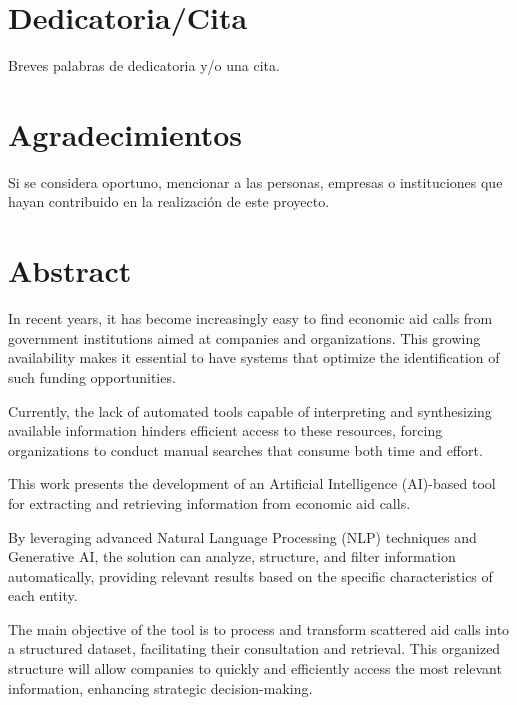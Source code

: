 \chapter*{Dedicatoria/Cita}

Breves palabras de dedicatoria y/o una cita.

\chapter*{Agradecimientos}

Si se considera oportuno, mencionar a las personas, empresas o instituciones que hayan contribuido en la realización de este proyecto.

\chapter*{Abstract}

\onehalfspacing

In recent years, it has become increasingly easy to find economic aid calls from government institutions aimed at companies and organizations. This growing availability makes it essential to have systems that optimize the identification of such funding opportunities.

Currently, the lack of automated tools capable of interpreting and synthesizing available information hinders efficient access to these resources, forcing organizations to conduct manual searches that consume both time and effort.

This work presents the development of an Artificial Intelligence (AI)-based tool for extracting and retrieving information from economic aid calls.

By leveraging advanced Natural Language Processing (NLP) techniques and Generative AI, the solution can analyze, structure, and filter information automatically, providing relevant results based on the specific characteristics of each entity.

The main objective of the tool is to process and transform scattered aid calls into a structured dataset, facilitating their consultation and retrieval. This organized structure will allow companies to quickly and efficiently access the most relevant information, enhancing strategic decision-making.


